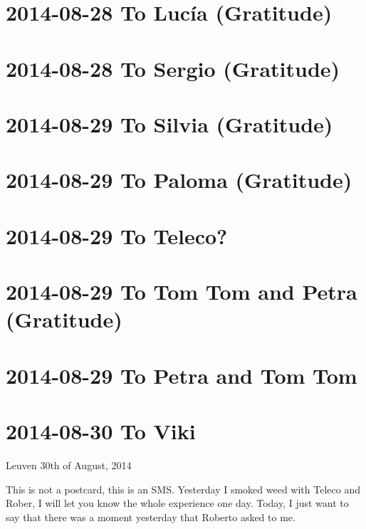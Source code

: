 \documentclass[]{book}
\begin{document}
\hypertarget{to-lucia-gratitude}{%
\section{2014-08-28 To Lucía (Gratitude)}\label{to-lucia-gratitude}}

\hypertarget{to-sergio-gratitude}{%
\section{2014-08-28 To Sergio (Gratitude)}\label{to-sergio-gratitude}}

\hypertarget{to-silvia-gratitude}{%
\section{2014-08-29 To Silvia (Gratitude)}\label{to-silvia-gratitude}}

\hypertarget{to-paloma-gratitude}{%
\section{2014-08-29 To Paloma (Gratitude)}\label{to-paloma-gratitude}}

\hypertarget{to-teleco}{%
\section{2014-08-29 To Teleco?}\label{to-teleco}}

\hypertarget{to-tom-tom-and-petra-gratitude}{%
\section{2014-08-29 To Tom Tom and Petra (Gratitude)}\label{to-tom-tom-and-petra-gratitude}}

\hypertarget{to-petra-and-tom-tom}{%
\section{2014-08-29 To Petra and Tom Tom}\label{to-petra-and-tom-tom}}

\hypertarget{to-viki-9}{%
\section{2014-08-30 To Viki}\label{to-viki-9}}

Leuven 30th of August, 2014

This is not a postcard, this is an SMS. Yesterday I smoked weed with Teleco and Rober, I will let you know the whole experience one day. Today, I just want to say that there was a moment yesterday that Roberto asked to me.
\end{document}
